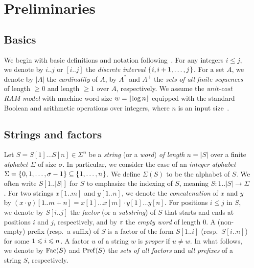 \section{Preliminaries}
\label{sec:prelim}

\subsection{Basics}
We begin with basic definitions and notation following~\cite{charalampopoulos2018extended,barton2014linear,ilie2011minimum,belazzougui2015space:unusual}.
For any integers $i\le j$, we denote by $i..j$ or $[i..j]$ the \textit{discrete interval} $\set{i, i+1, \dots, j}$. For a set $A$, we denote by $|A|$ the \textit{cardinality} of $A$, by $A^*$ and $A^+$ the \textit{sets of all finite sequences} of length $\ge 0$ and length $\ge 1$ over $A$, respectively.
We assume the \textit{unit-cost RAM model} with machine word size $w = \floor{\log n}$ equipped with the standard Boolean and arithmetic operations over integers, where $n$ is an input size~\cite{cormen2009introduction}.

\subsection{Strings and factors}
Let $S = S[1]\dots S[n] \in \Sigma^n$ be a \textit{string} (or a \textit{word}) \textit{of length} $n = |S|$ over a finite \textit{alphabet} $\Sigma$ of size $\sigma$. In particular, we consider the case of an \textit{integer alphabet} $\Sigma = \set{0,1,\dots, \sigma - 1} \subseteq \set{1, \dots, n}$. We define $\Sigma(S)$ to be the alphabet of $S$. 
We often write $S[1..|S|]$ for $S$ to emphasize the indexing of $S$, meaning $S: 1..|S| \to \Sigma$. 
For two strings $x[1..m]$ and $y[1..n]$, we denote the \textit{concatenation} of $x$ and $y$ by $(x\cdot y)[1..m+n] = x[1]\dots x[m]\cdot y[1]\dots y[n]$.
For positions $i\le j$ in $S$, we denote by $S[i..j]$ the \textit{factor} (or a \textit{substring}) of $S$ that starts and ends at positions $i$ and $j$, respectively, and by $\eps$ the \textit{empty word} of length $0$. A (non-empty) prefix (resp.~a suffix) of $S$ is a factor of the form $S[1..i]$ (resp.~$S[i..n]$) for some $\btw i1n$. A factor $u$ of a string $w$ is \textit{proper} if $u\not= w$. In what follows, we denote by $\Fac(S)$ and $\Pref(S)$ the \textit{sets of all factors} and \textit{all prefixes} of a string $S$, respectively. 

